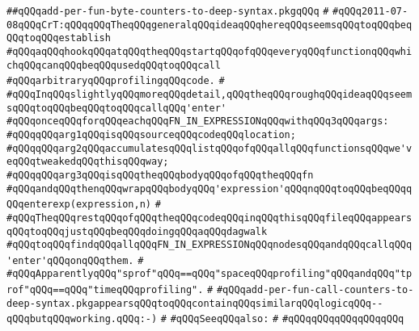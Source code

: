\label{src/lib/compiler/debugging-and-profiling/profiling/add-per-fun-byte-counters-to-deep-syntax.pkg}
\verb|##qQQqadd-per-fun-byte-counters-to-deep-syntax.pkgqQQq|\newline
\verb|#|\newline
\verb|#qQQq2011-07-08qQQqCrT:qQQqqQQqTheqQQqgeneralqQQqideaqQQqhereqQQqseemsqQQqtoqQQqbeqQQqtoqQQqestablish|\newline
\verb|#qQQqaqQQqhookqQQqatqQQqtheqQQqstartqQQqofqQQqeveryqQQqfunctionqQQqwhichqQQqcanqQQqbeqQQqusedqQQqtoqQQqcall|\newline
\verb|#qQQqarbitraryqQQqprofilingqQQqcode.|\newline
\verb|#|\newline
\verb|#qQQqInqQQqslightlyqQQqmoreqQQqdetail,qQQqtheqQQqroughqQQqideaqQQqseemsqQQqtoqQQqbeqQQqtoqQQqcallqQQq'enter'|\newline
\verb|#qQQqonceqQQqforqQQqeachqQQqFN_IN_EXPRESSIONqQQqwithqQQq3qQQqargs:|\newline
\verb|#qQQqqQQqarg1qQQqisqQQqsourceqQQqcodeqQQqlocation;|\newline
\verb|#qQQqqQQqarg2qQQqaccumulatesqQQqlistqQQqofqQQqallqQQqfunctionsqQQqwe'veqQQqtweakedqQQqthisqQQqway;|\newline
\verb|#qQQqqQQqarg3qQQqisqQQqtheqQQqbodyqQQqofqQQqtheqQQqfn|\newline
\verb|#qQQqandqQQqthenqQQqwrapqQQqbodyqQQq'expression'qQQqnqQQqtoqQQqbeqQQqqQQqenterexp(expression,n)|\newline
\verb|#|\newline
\verb|#qQQqTheqQQqrestqQQqofqQQqtheqQQqcodeqQQqinqQQqthisqQQqfileqQQqappearsqQQqtoqQQqjustqQQqbeqQQqdoingqQQqaqQQqdagwalk|\newline
\verb|#qQQqtoqQQqfindqQQqallqQQqFN_IN_EXPRESSIONqQQqnodesqQQqandqQQqcallqQQq'enter'qQQqonqQQqthem.|\newline
\verb|#|\newline
\verb|#qQQqApparentlyqQQq"sprof"qQQq==qQQq"spaceqQQqprofiling"qQQqandqQQq"tprof"qQQq==qQQq"timeqQQqprofiling".|\newline
\verb|#|\newline
\verb|#qQQqadd-per-fun-call-counters-to-deep-syntax.pkgappearsqQQqtoqQQqcontainqQQqsimilarqQQqlogicqQQq--qQQqbutqQQqworking.qQQq:-)|\newline
\verb|#|\newline
\verb|#qQQqSeeqQQqalso:|\newline
\verb|#|\newline
\verb|#qQQqqQQqqQQqqQQqqQQq|\newline
